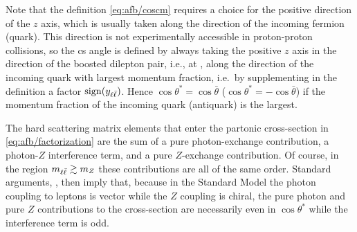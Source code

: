 Note that the definition \cref{eq:afb/coscm} requires a choice for the positive
direction of the $z$ axis, which is usually taken along the direction of the
incoming fermion (quark).
%
This direction is  not experimentally accessible in proton-proton collisions,
so the \acrlong{cs} angle is defined by always taking the positive $z$ axis in
the direction of the boosted dilepton pair, i.e., at \lo, along the direction of
the incoming quark with largest momentum fraction, i.e.\ by supplementing in
the definition a factor $\operatorname{sign}(y_{\ell\bar{\ell}})$.
%
Hence $\cos\theta^*=\cos{\bar\theta}$ ($\cos\theta^*=-\cos{\bar\theta}$)  if
the momentum fraction of the incoming quark (antiquark) is the largest.

%
The hard scattering matrix elements that enter the partonic cross-section
in \cref{eq:afb/factorization} are the sum of a pure photon-exchange
contribution, a photon-$Z$ interference term, and a pure $Z$-exchange
contribution.
%
Of course, in the region $m_{\ell\bar{\ell}} \gtrsim m_Z$ these contributions are all of the
same order.
%
Standard arguments, \cite{Peskin:1995ev}, then imply that, because in the
Standard Model the photon coupling to leptons is vector  while the $Z$ coupling
is chiral, the pure photon and pure $Z$ contributions to the cross-section are
necessarily  even in $\cos\theta^*$ while the interference term is odd.

